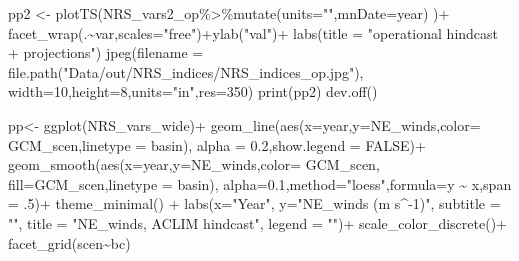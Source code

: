 \documentclass[
]{article}
\newenvironment{Shaded}{\begin{snugshade}}{\end{snugshade}}
\newcommand{\AttributeTok}[1]{\textcolor[rgb]{0.77,0.63,0.00}{#1}}
\newcommand{\ConstantTok}[1]{\textcolor[rgb]{0.00,0.00,0.00}{#1}}
\newcommand{\DecValTok}[1]{\textcolor[rgb]{0.00,0.00,0.81}{#1}}
\newcommand{\FloatTok}[1]{\textcolor[rgb]{0.00,0.00,0.81}{#1}}
\newcommand{\FunctionTok}[1]{\textcolor[rgb]{0.00,0.00,0.00}{#1}}
\newcommand{\NormalTok}[1]{#1}
\newcommand{\OtherTok}[1]{\textcolor[rgb]{0.56,0.35,0.01}{#1}}
\newcommand{\SpecialCharTok}[1]{\textcolor[rgb]{0.00,0.00,0.00}{#1}}
\newcommand{\StringTok}[1]{\textcolor[rgb]{0.31,0.60,0.02}{#1}}
\begin{document}
\begin{Shaded}
\begin{Highlighting}[]
     
\NormalTok{     pp2 }\OtherTok{\textless{}{-}} \FunctionTok{plotTS}\NormalTok{(NRS\_vars2\_op}\SpecialCharTok{\%\textgreater{}\%}\FunctionTok{mutate}\NormalTok{(}\AttributeTok{units=}\StringTok{""}\NormalTok{,}\AttributeTok{mnDate=}\NormalTok{year) )}\SpecialCharTok{+}
       \FunctionTok{facet\_wrap}\NormalTok{(.}\SpecialCharTok{\textasciitilde{}}\NormalTok{var,}\AttributeTok{scales=}\StringTok{"free"}\NormalTok{)}\SpecialCharTok{+}\FunctionTok{ylab}\NormalTok{(}\StringTok{"val"}\NormalTok{)}\SpecialCharTok{+}
       \FunctionTok{labs}\NormalTok{(}\AttributeTok{title =} \StringTok{"operational hindcast + projections"}\NormalTok{)}
     \FunctionTok{jpeg}\NormalTok{(}\AttributeTok{filename =} \FunctionTok{file.path}\NormalTok{(}\StringTok{"Data/out/NRS\_indices/NRS\_indices\_op.jpg"}\NormalTok{),}
          \AttributeTok{width=}\DecValTok{10}\NormalTok{,}\AttributeTok{height=}\DecValTok{8}\NormalTok{,}\AttributeTok{units=}\StringTok{"in"}\NormalTok{,}\AttributeTok{res=}\DecValTok{350}\NormalTok{)}
     \FunctionTok{print}\NormalTok{(pp2)}
     \FunctionTok{dev.off}\NormalTok{()}
     
     
\NormalTok{    pp}\OtherTok{\textless{}{-}} \FunctionTok{ggplot}\NormalTok{(NRS\_vars\_wide)}\SpecialCharTok{+}
        \FunctionTok{geom\_line}\NormalTok{(}\FunctionTok{aes}\NormalTok{(}\AttributeTok{x=}\NormalTok{year,}\AttributeTok{y=}\NormalTok{NE\_winds,}\AttributeTok{color=}\NormalTok{ GCM\_scen,}\AttributeTok{linetype =}\NormalTok{ basin),}
                  \AttributeTok{alpha =} \FloatTok{0.2}\NormalTok{,}\AttributeTok{show.legend =} \ConstantTok{FALSE}\NormalTok{)}\SpecialCharTok{+}
        \FunctionTok{geom\_smooth}\NormalTok{(}\FunctionTok{aes}\NormalTok{(}\AttributeTok{x=}\NormalTok{year,}\AttributeTok{y=}\NormalTok{NE\_winds,}\AttributeTok{color=}\NormalTok{ GCM\_scen,}
                        \AttributeTok{fill=}\NormalTok{GCM\_scen,}\AttributeTok{linetype =}\NormalTok{ basin),}
                    \AttributeTok{alpha=}\FloatTok{0.1}\NormalTok{,}\AttributeTok{method=}\StringTok{"loess"}\NormalTok{,}\AttributeTok{formula=}\StringTok{\textquotesingle{}y \textasciitilde{} x\textquotesingle{}}\NormalTok{,}\AttributeTok{span =}\NormalTok{ .}\DecValTok{5}\NormalTok{)}\SpecialCharTok{+}
        \FunctionTok{theme\_minimal}\NormalTok{() }\SpecialCharTok{+} 
        \FunctionTok{labs}\NormalTok{(}\AttributeTok{x=}\StringTok{"Year"}\NormalTok{,}
             \AttributeTok{y=}\StringTok{"NE\_winds (m s\^{}{-}1)"}\NormalTok{,}
             \AttributeTok{subtitle =} \StringTok{""}\NormalTok{,}
             \AttributeTok{title =} \StringTok{"NE\_winds, ACLIM hindcast"}\NormalTok{,}
             \AttributeTok{legend =} \StringTok{""}\NormalTok{)}\SpecialCharTok{+}
        \FunctionTok{scale\_color\_discrete}\NormalTok{()}\SpecialCharTok{+} \FunctionTok{facet\_grid}\NormalTok{(scen}\SpecialCharTok{\textasciitilde{}}\NormalTok{bc)}
     

\end{Highlighting}
\end{Shaded}
\end{document}
